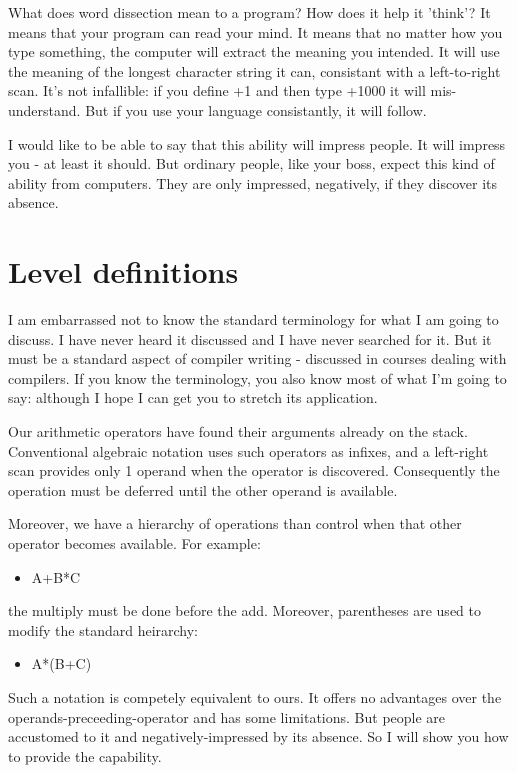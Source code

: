 \documentclass[b5paper, oneside]{book}
\begin{document}
What does word dissection mean to a program? How does it help it 'think'? It means that your program can read your mind. It means that no matter how you type something, the computer will extract the meaning you intended. It will use the meaning of the longest character string it can, consistant with a left-to-right scan. It's not infallible: if you define +1 and then type +1000 it will mis-understand. But if you use your language consistantly, it will follow.

I would like to be able to say that this ability will impress people. It will impress you - at least it should. But ordinary people, like your boss, expect this kind of ability from computers. They are only impressed, negatively, if they discover its absence.

\section{Level definitions}
I am embarrassed not to know the standard terminology for what I am going to discuss. I have never heard it discussed and I have never searched for it. But it must be a standard aspect of compiler writing - discussed in courses dealing with compilers. If you know the terminology, you also know most of what I'm going to say: although I hope I can get you to stretch its application.

Our arithmetic operators have found their arguments already on the stack. Conventional algebraic notation uses such operators as infixes, and a left-right scan provides only 1 operand when the operator is discovered. Consequently the operation must be deferred until the other operand is available.

Moreover, we have a hierarchy of operations than control when that other operator becomes available. For example:\begin{itemize}
   \item A+B*C\end{itemize}
the multiply must be done before the add. Moreover, parentheses are used to modify the standard heirarchy:\begin{itemize}
   \item A*(B+C)\end{itemize}
Such a notation is competely equivalent to ours. It offers no advantages over the operands-preceeding-operator and has some limitations. But people are accustomed to it and negatively-impressed by its absence. So I will show you how to provide the capability.
\end{document}

